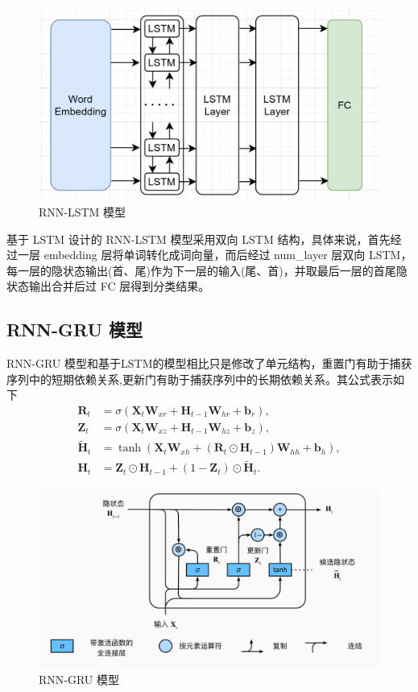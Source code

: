 \documentclass{article}
\begin{document}
\begin{spacing}{1.1}
	\begin{figure}[h]
		\centering
		\includegraphics[width=0.8\linewidth]{pic/LSTM-full.png}
		\caption{RNN-LSTM 模型}
	\end{figure}
	
	基于 LSTM 设计的 RNN-LSTM 模型采用双向 LSTM 结构，具体来说，首先经过一层 embedding 层将单词转化成词向量，而后经过 num\_layer 层双向 LSTM，每一层的隐状态输出(首、尾)作为下一层的输入(尾、首)，并取最后一层的首尾隐状态输出合并后过 FC 层得到分类结果。
	
	\subsection{RNN-GRU 模型}
	\hspace{1.4em}
	RNN-GRU 模型和基于LSTM的模型相比只是修改了单元结构，重置门有助于捕获序列中的短期依赖关系,更新门有助于捕获序列中的长期依赖关系。其公式表示如下
	$$
	\begin{aligned}
	\mathbf{R}_t &= \sigma(\mathbf{X}_t \mathbf{W}_{xr} + \mathbf{H}_{t-1} \mathbf{W}_{hr} + \mathbf{b}_r),\\
	\mathbf{Z}_t &= \sigma(\mathbf{X}_t \mathbf{W}_{xz} + \mathbf{H}_{t-1} \mathbf{W}_{hz} + \mathbf{b}_z),\\
	\tilde{\mathbf{H}}_t &= \tanh(\mathbf{X}_t \mathbf{W}_{xh} + \left(\mathbf{R}_t \odot \mathbf{H}_{t-1}\right) \mathbf{W}_{hh} + \mathbf{b}_h),\\
	\mathbf{H}_t &= \mathbf{Z}_t \odot \mathbf{H}_{t-1}  + (1 - \mathbf{Z}_t) \odot \tilde{\mathbf{H}}_t.
	\end{aligned}
	$$	
	\begin{figure}[h]
		\centering
		\includegraphics[width=0.8\linewidth]{pic/GRU.png}
		\caption{RNN-GRU 模型}
	\end{figure}



\end{spacing}
\end{document}
